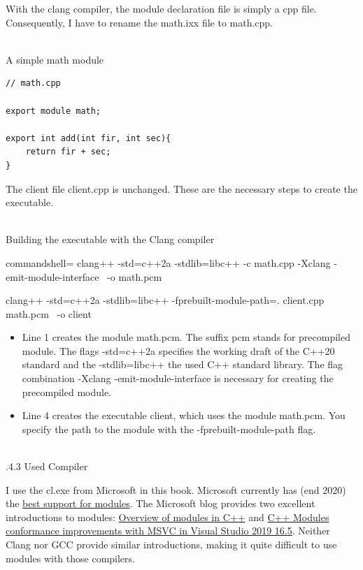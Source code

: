 With the clang compiler, the module declaration file is simply a cpp file. Consequently, I have to rename the math.ixx file to math.cpp.

\hspace*{\fill} \\ %
\noindent
A simple math module
\begin{lstlisting}[style=styleCXX]
// math.cpp

export module math;

export int add(int fir, int sec){
	return fir + sec;
}
\end{lstlisting}

The client file client.cpp is unchanged. These are the necessary steps to create the executable.

\hspace*{\fill} \\ %
\noindent
Building the executable with the Clang compiler
\begin{tcblisting}{commandshell={}}
clang++ -std=c++2a -stdlib=libc++ -c math.cpp -Xclang -emit-module-interface \
   -o math.pcm

clang++ -std=c++2a -stdlib=libc++ -fprebuilt-module-path=. client.cpp math.pcm \
   -o client
\end{tcblisting}

\begin{itemize}
\item 
Line 1 creates the module math.pcm. The suffix pcm stands for precompiled module. The flags -std=c++2a specifies the working draft of the C++20 standard and the -stdlib=libc++ the used C++ standard library. The flag combination -Xclang -emit-module-interface is necessary for creating the precompiled module.

\item 
Line 4 creates the executable client, which uses the module math.pcm. You specify the path to the module with the -fprebuilt-module-path flag.
\end{itemize}

\hspace*{\fill} \\ %
.4.3\hspace{0.2cm} Used Compiler

I use the cl.exe from Microsoft in this book. Microsoft currently has (end 2020) the \href{https://en.cppreference.com/w/cpp/compiler_support}{best support for modules}. The Microsoft blog provides two excellent introductions to modules: \href{https://docs.microsoft.com/en-us/cpp/cpp/modules-cpp?view=msvc-160&viewFallbackFrom=vs-2019}{Overview of modules in C++} and \href{https://devblogs.microsoft.com/cppblog/c-modules-conformance-improvements-with-msvc-in-visual-studio-2019-16-5/}{C++ Modules conformance improvements with MSVC in Visual Studio 2019 16.5}. Neither Clang nor GCC provide similar introductions, making it quite difficult to use modules with those compilers.


